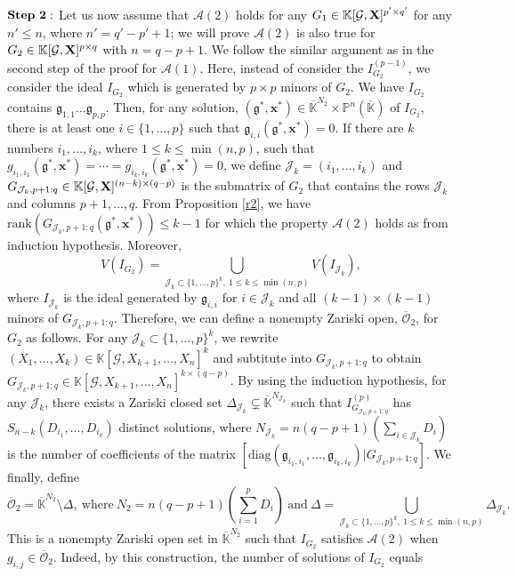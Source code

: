 \documentclass[11pt]{article}
\numberwithin{Property}{section}
\numberwithin{Theorem}{section}
\numberwithin{Proposition}{section}
\numberwithin{Lemma}{section}
\numberwithin{Corollary}{section}
\numberwithin{Definition}{section}
\numberwithin{Remark}{section}
\numberwithin{Conjecture}{section}
\numberwithin{Problem}{section}
\numberwithin{Claim}{section}
\theoremstyle{definition}
\numberwithin{Example}{section}
\renewcommand{\leq}{\leqslant}
\def\bar{\overline}
\newcommand{\field}{\mathbb{K}} %
\newcommand{\mat}[1]{\mathbf{\MakeUppercase{#1}}} %
\begin{document}
$\bf{Step \ 2:}$ Let us now assume that $\mathcal{A}(2)$ holds for any $G_1 \in \field[{\mathcal{G}, \mat{X}}]^{p' \times q'}$ for any $n' \leq n$, where $n' = q'-p'+1$; we will prove $\mathcal{A}(2)$ is also true for $G_2 \in \field[\mathcal{G}, \mat{X}]^{p \times q}$ with $n = q-p+1$. We follow the similar argument as in the second step of the proof for $\mathcal{A}(1)$. Here, instead of consider the $I_{G_2}^{(p-1)}$, we consider the ideal $I_{G_2}$ which is generated by $p \times p$ minors of $G_2$. We have $I_{G_2}$ contains $\mathfrak{g}_{1,1}\ldots \mathfrak{g}_{p,p}$. Then, for any solution, $(\mathfrak{g}^*,\mathbf{x}^*) \in \bar{\field}^{N_2} \times \mathbb{P}^n(\bar{\field})$ of $I_{G_2}$, there is at least one $i \in \{1, \ldots, p\}$ such that $\mathfrak{g}_{i,i}(\mathfrak{g}^*,\mathbf{x}^*) = 0$. If there are $k$ numbers $i_1, \ldots, i_k$, where $1 \leq k \leq \min(n,p)$, such that $g_{i_1, i_1}(\mathfrak{g}^*, \mathbf{x}^*) = \cdots = g_{i_k, i_k}(\mathfrak{g}^*, \mathbf{x}^*) = 0$, we define $\mathcal{J}_k = (i_1, \ldots, i_k)$ and $G_{\mathcal{J}_k, p+1:q} \in \field[\mathcal{G}, \mat{X}]^{(n-k)\times (q-p)}$ is the submatrix of $G_2$ that contains the rows $\mathcal{J}_k$ and columns $p+1, \ldots, q$. From Proposition \ref{r2}, we have $\mathrm{rank}(G_{\mathcal{J}_k, p+1:q}(\mathfrak{g}^*, \mathbf{x}^*)) \leq k-1$ for which the property $\mathcal{A}(2)$ holds as from induction hypothesis. Moreover, $$V(I_{G_2}) = \bigcup\limits_{\mathcal{J}_k \subset\{1, \ldots, p\}^k, \ 1 \leq k \leq \min(n,p)} V(I_{\mathcal{J}_k}),$$ where $I_{\mathcal{J}_k}$ is the ideal generated by $\mathfrak{g}_{i,i}$ for $i \in \mathcal{J}_k$ and all $(k-1)\times(k-1)$ minors of $G_{\mathcal{J}_k, p+1:q}$. Therefore, we can define a nonempty Zariski open, $\bar{\mathcal{O}}_2$, for $G_2$ as follows. For any $\mathcal{J}_k \subset \{1, \ldots, p\}^k$, we rewrite $(X_1, \ldots, X_k) \in \field[\mathcal{G}, X_{k+1}, \ldots, X_n]^{k}$ and subtitute into $G_{\mathcal{J}_k, p+1:q}$ to obtain $G_{\mathcal{J}_k, p+1:q} \in \field[\mathcal{G}, X_{k+1}, \ldots, X_n]^{k \times {(q-p)}}$. By using the induction hypothesis, for any $\mathcal{J}_k$, there exists a Zariski closed set $\Delta_{\mathcal{J}_k} \subsetneq \bar{\field}^{N_{\mathcal{J}_k}}$ such that $I_{G_{\mathcal{J}_k, p+1:q}}^{(p)}$ has $S_{n-k}(D_{i_1}, \ldots, D_{i_k})$ distinct solutions, where $N_{\mathcal{J}_k} = n(q-p+1)(\sum_{i \in \mathcal{J}_k}D_i)$ is the number of coefficients of the matrix $[\mathrm{diag}(\mathfrak{g}_{i_1, i_1}, \ldots, \mathfrak{g}_{i_k, i_k})|G_{\mathcal{J}_k, p+1:q}]$. We finally, define \[\bar{\mathcal{O}}_2 = \bar{\field}^{N_2} \setminus \Delta, \ \mathrm{where}\  N_2 = n(q-p+1)(\sum_{i=1}^pD_i) \ \mathrm{and} \ \Delta = \bigcup_{\mathcal{J}_k \subset\{1, \ldots, p\}^k, \ 1 \leq k \leq \min(n,p)}\Delta_{\mathcal{J}_k}.\]
This is a nonempty Zariski open set in $\bar{\field}^{N_2}$ such that $I_{G_2}$ satisfies $\mathcal{A}(2)$ when $g_{i,j} \in \bar{\mathcal{O}}_2$. Indeed, by this construction, the number of solutions of $I_{G_2}$ equals
\end{document}
